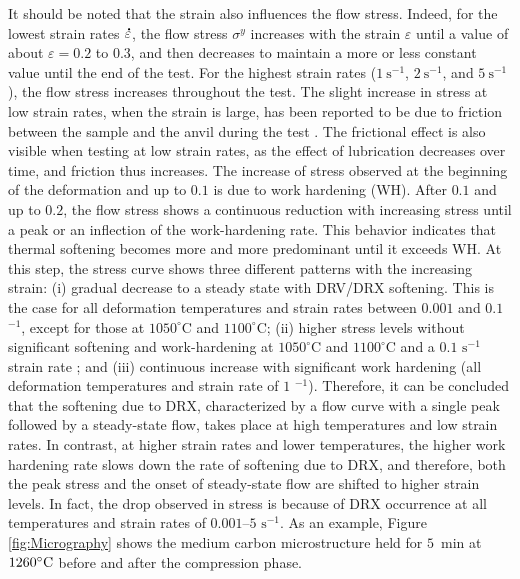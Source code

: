\documentclass[twoside,english,1p,final,sort&compress]{elsarticle}
\theoremstyle{plain}
\DeclareRobustCommand{\mdot}[1]{\accentset{\mbox{\bfseries .}}{#1}}
\DeclareRobustCommand{\ps}{\text{s}^{-1}}
\begin{document}
It should be noted that the strain also influences the flow stress.
Indeed, for the lowest strain rates $\mdot\varepsilon$, the flow stress $\sigma^y$ increases with the strain $\varepsilon$ until a value of about $\varepsilon=0.2$ to $0.3$, and then decreases to maintain a more or less constant value until the end of the test.
For the highest strain rates ($1~\ps$, $2~\ps$, and $5~\ps$), the flow stress increases throughout the test.
The slight increase in stress at low strain rates, when the strain is large, has been reported to be due to friction between the sample and the anvil during the test \cite{buckley2001deformation}. The frictional effect is also visible when testing at low strain rates, as the effect of lubrication decreases over time, and friction thus increases. The increase of stress observed at the beginning of the deformation and up to $0.1$ is due to work hardening (WH). After $0.1$ and up to $0.2$, the flow stress shows a continuous reduction with increasing stress until a peak or an inflection of the work-hardening rate. This behavior indicates that thermal softening becomes more and more predominant until it exceeds WH. At this step, the stress curve shows three different patterns with the increasing strain: (i) gradual decrease to a steady state with DRV/DRX softening. This is the case for all deformation temperatures and strain rates between $0.001$ and $0.1$ $^{-1}$, except for those at $1050^\circ$C and $1100^\circ$C; (ii) higher stress levels without significant softening and work-hardening at $1050^\circ$C and $1100^\circ$C and a $0.1$ $\text{s}^{-1}$  strain rate ; and (iii) continuous increase with significant work hardening (all deformation temperatures and strain rate of $1$ $^{-1}$). Therefore, it can be concluded that the softening due to DRX, characterized by a flow curve with a single peak followed by a steady-state flow, takes place at high temperatures and low strain rates. In contrast, at higher strain rates and lower temperatures, the higher work hardening rate slows down the rate of softening due to DRX, and therefore, both the peak stress and the onset of steady-state flow are shifted to higher strain levels. In fact, the drop observed in
stress is because of DRX occurrence at all temperatures and strain rates of $0.001$–$5$ $\text{s}^{-1}$. As an example, Figure \ref{fig:Micrography} shows the medium carbon microstructure held for $5$~min at $1260\celsius$ before and after the compression phase.
\end{document}
